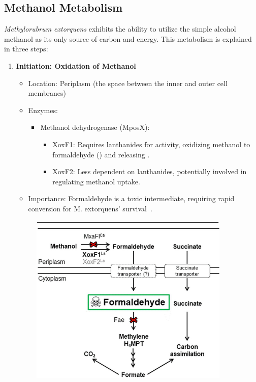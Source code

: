 \subsection{Methanol Metabolism\authorB}
\emph{Methylorubrum extorquens} exhibits the ability to utilize the simple alcohol methanol  as its only source of carbon and energy.
This metabolism is explained in three steps:

\begin{enumerate}
    \item \textbf{Initiation: Oxidation of Methanol}
    \begin{itemize}
        \item Location: Periplasm (the space between the inner and outer cell membranes)
        \item Enzymes:
        \begin{itemize}
            \item Methanol dehydrogenase (MposX):
            \begin{itemize}
                \item XoxF1: Requires lanthanides for activity, oxidizing methanol to
                formaldehyde () and releasing .
                \item XoxF2: Less dependent on lanthanides, potentially involved in
                regulating methanol uptake.
            \end{itemize}
        \end{itemize}
        \item Importance: Formaldehyde is a toxic intermediate, requiring rapid conversion for M. extorquens' survival~\cite{methanol_metabolism}.
    \end{itemize}
    \begin{figure}[H]
        \centering
        \includegraphics[width=0.9\textwidth]{./media/images/mextorquens_metabolism_methanol}

\end{figure}
\end{enumerate}
